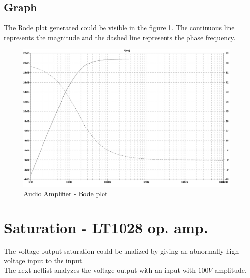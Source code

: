 \documentclass[10pt,a4paper]{book}
\begin{document}
\subsection{Graph}
The Bode plot generated could be visible in the figure \ref{1d3graph}. The continuous line represents the magnitude and the dashed line represents the phase frequency.\\

\begin{figure}[H]
  \centering
  \includegraphics[width=14cm]{graph/1d3.jpg}
  \caption{Audio Amplifier - Bode plot}
  \label{1d3graph}
\end{figure}

\section{Saturation - LT1028 op. amp.}
The voltage output saturation could be analized by giving an abnormally high voltage input to the input.\\
The next netlist analyzes the voltage output with an input with $100V$ amplitude.\\


\end{document}
